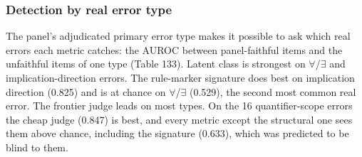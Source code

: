 \documentclass[11pt,letterpaper]{article}
\begin{document}
\subsubsection{Detection by real error type}

The panel's adjudicated primary error type makes it possible to ask which real errors each metric catches: the AUROC between panel-faithful items and the unfaithful items of one type (Table 133). Latent class is strongest on $\forall$/$\exists$ and implication-direction errors. The rule-marker signature does best on implication direction (0.825) and is at chance on $\forall$/$\exists$ (0.529), the second most common real error. The frontier judge leads on most types. On the 16 quantifier-scope errors the cheap judge (0.847) is best, and every metric except the structural one sees them above chance, including the signature (0.633), which was predicted to be blind to them.
\end{document}
